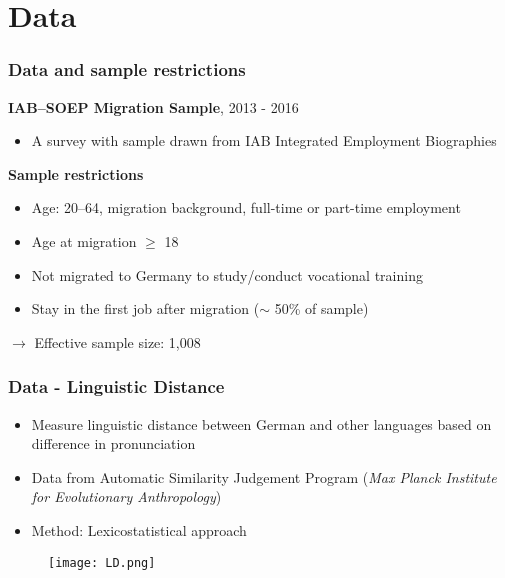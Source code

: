 \documentclass{beamer}
\begin{document}
\section{Data}

\begin{frame}
\frametitle{Data and sample restrictions}
\textbf{IAB--SOEP Migration Sample}, 2013 - 2016
\begin{itemize}
\item A survey with sample drawn from IAB Integrated Employment Biographies
\end{itemize}
\textbf{Sample restrictions}
\begin{itemize}
\item Age: 20--64, migration background, full-time or part-time employment
\item Age at migration $\geq$ 18
\item Not migrated to Germany to study/conduct vocational training
\item Stay in the first job after migration ($\sim$ 50\% of sample)
\end{itemize}
$\rightarrow$ Effective sample size: 1,008

\end{frame}


\begin{frame}
\frametitle{Data - Linguistic Distance}
\begin{itemize}
\item Measure linguistic distance between German and other languages based on difference in pronunciation
\item Data from Automatic Similarity Judgement Program (\textit{Max Planck Institute for Evolutionary Anthropology})
\item Method: Lexicostatistical approach
\end{itemize}

\begin{figure}
\centering
\texttt{[image: LD.png]}
\end{figure}
\end{frame}
\end{document}
